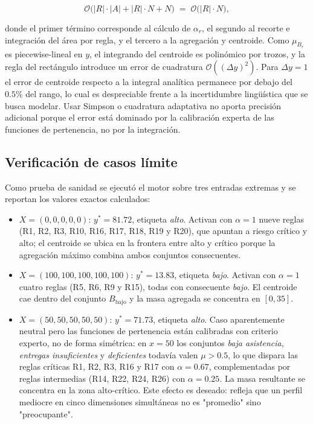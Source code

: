 \begin{equation}
\mathcal{O}\bigl(|R|\cdot|A| + |R|\cdot N + N\bigr)
\;=\;\mathcal{O}\bigl(|R|\cdot N\bigr),
\label{eq:complejidad}
\end{equation}

donde el primer término corresponde al cálculo de $\alpha_r$, el segundo al recorte e integración del área por regla, y el tercero a la agregación y centroide. Como $\mu_{B_r}$ es piecewise-lineal en $y$, el integrando del centroide es polinómico por trozos, y la regla del rectángulo introduce un error de cuadratura $\mathcal{O}((\Delta y)^2)$. Para $\Delta y = 1$ el error de centroide respecto a la integral analítica permanece por debajo del $0.5\%$ del rango, lo cual es despreciable frente a la incertidumbre lingüística que se busca modelar. Usar Simpson o cuadratura adaptativa no aporta precisión adicional porque el error está dominado por la calibración experta de las funciones de pertenencia, no por la integración.

\subsection{Verificación de casos límite}

Como prueba de sanidad se ejecutó el motor sobre tres entradas extremas y se reportan los valores exactos calculados:

\begin{itemize}
  \item $X=(0,0,0,0,0)$: $y^*=81.72$, etiqueta \emph{alto}. Activan con $\alpha=1$ nueve reglas (R1, R2, R3, R10, R16, R17, R18, R19 y R20), que apuntan a riesgo crítico y alto; el centroide se ubica en la frontera entre alto y crítico porque la agregación máximo combina ambos conjuntos consecuentes.
  \item $X=(100,100,100,100,100)$: $y^*=13.83$, etiqueta \emph{bajo}. Activan con $\alpha=1$ cuatro reglas (R5, R6, R9 y R15), todas con consecuente \emph{bajo}. El centroide cae dentro del conjunto $B_{\text{bajo}}$ y la masa agregada se concentra en $[0,35]$.
  \item $X=(50,50,50,50,50)$: $y^*=71.73$, etiqueta \emph{alto}. Caso aparentemente neutral pero las funciones de pertenencia están calibradas con criterio experto, no de forma simétrica: en $x=50$ los conjuntos \emph{baja asistencia}, \emph{entregas insuficientes} y \emph{deficientes} todavía valen $\mu>0.5$, lo que dispara las reglas críticas R1, R2, R3, R16 y R17 con $\alpha=0.67$, complementadas por reglas intermedias (R14, R22, R24, R26) con $\alpha=0.25$. La masa resultante se concentra en la zona alto-crítico. Este efecto es deseado: refleja que un perfil mediocre en cinco dimensiones simultáneas no es "promedio" sino "preocupante".
\end{itemize}

